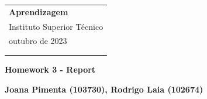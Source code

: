\documentclass[a4paper,12pt]{article} %
\begin{document}
\thispagestyle{empty} %

\begin{tabular}{p{15.5cm}} %
{\large \bf Aprendizagem} \\
Instituto Superior Técnico \\ outubro  de 2023  \\ \\ 
\hline %
\\
\end{tabular} %

\vspace*{0.3cm} %

\begin{center} %
	{\Large \bf Homework 3 - Report} %
	\vspace{2mm}
	
	{\bf Joana Pimenta (103730), Rodrigo Laia (102674) } %
		
\end{center}  

\vspace{0.4cm}
\end{document}
